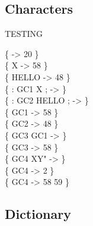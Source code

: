 \subsection{Characters}

\begin{tt}
TESTING  \word{[CHAR]} \word{[} \word{]}  

\{  -> 20 \} \\
\{  X     -> 58 \} \\
\{  HELLO -> 48 \} \\
\{ : GC1 \word{[CHAR]} X     ; -> \} \\
\{ : GC2 \word{[CHAR]} HELLO ; -> \} \\
\{ GC1 -> 58 \} \\
\{ GC2 -> 48 \} \\
\{ \word{:} GC3 \word{[} GC1 \word{]}  \word{;} -> \} \\
\{ GC3 -> 58 \} \\
\{ \word{:} GC4  XY" \word{;} -> \} \\
\{ GC4   -> 2 \} \\
\{ GC4       -> 58 59 \}
\end{tt}

\subsection{Dictionary}

